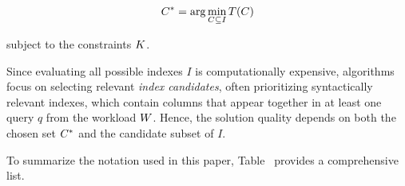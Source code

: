 $$
C^* = \arg \min_{C \subseteq I} T(C)
$$

subject to the constraints $K$. 

Since evaluating all possible indexes $I$ is computationally expensive, algorithms focus on selecting relevant \textit{index candidates}, often prioritizing syntactically relevant indexes, which contain columns that appear together in at least one query $q$ from the workload $W$. Hence, the solution quality depends on both the chosen set $C^*$ and the candidate subset of $I$.

\vspace{1em}


To summarize the notation used in this paper, Table~ provides a comprehensive list.

